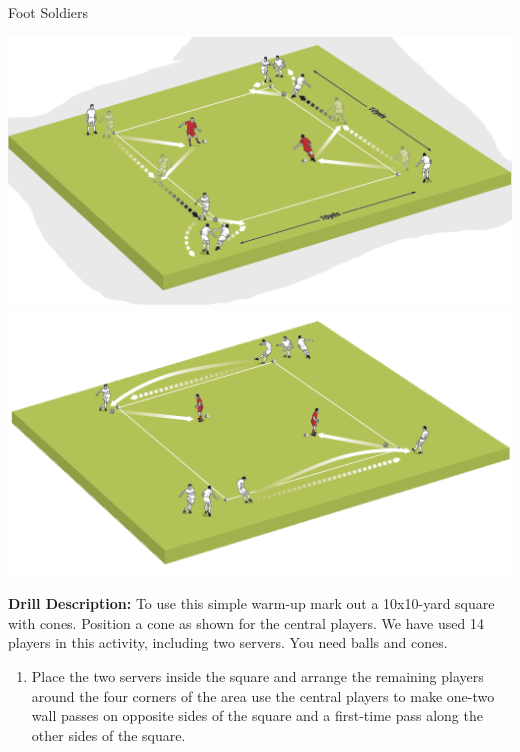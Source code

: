 \begin{evenBlock}{Foot Soldiers}

\begin{minipage}[t]{\linewidth}
    \centering
    
    \begin{minipage}{.4\linewidth} %
        \centering
        \includegraphics[width=\textwidth]{../img/Trimmed/FootSoldiers1}
        \vspace{6pt}
        \includegraphics[width=\textwidth]{../img/Trimmed/Footsoldiers2}
    \end{minipage}
    \hspace{0.05\linewidth}
    \begin{minipage}{.5\linewidth} %
        \textbf{Drill Description:}
        To use this simple warm-up mark out a 10x10-yard square with cones. Position a cone as shown for the central players. We have used 14 players in this activity, including two servers. You need balls and cones.
        \begin{enumerate}
        \setlength{\itemsep}{0pt}
        \setlength{\parskip}{0pt}
        \setlength{\parsep}{0pt}
        \item Place the two servers inside the square and arrange the remaining players around the four corners of the area use the central players to make one-two wall passes on opposite sides of the square and a first-time pass along the other sides of the square.

\end{enumerate}
\end{minipage}
\end{minipage}
\end{evenBlock}
